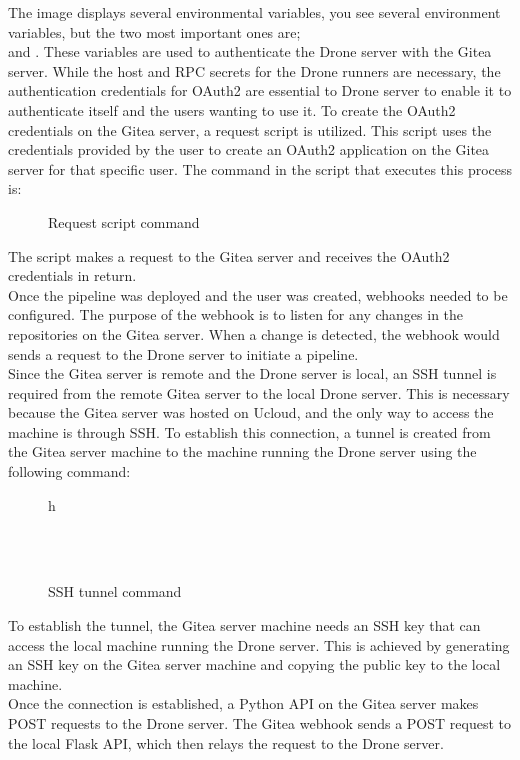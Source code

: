 The image displays several environmental variables,
you see several environment variables, 
but the two most important ones are; \\  and . 
These variables are used to authenticate the Drone server with the Gitea server. 
While the host and RPC secrets for the Drone runners are necessary, 
the authentication credentials for OAuth2 are essential to Drone server to enable it to authenticate itself and the users 
wanting to use it.
To create the OAuth2 credentials 
on the Gitea server, a request script is utilized. This script uses the credentials provided by the user to create an OAuth2 application on the 
Gitea server for that specific user. The command in the script that executes this process is:
\begin{figure}
    \begin{center}
    \end{center}
    \caption{Request script command}
    \label{fig:request-script-command}
\end{figure}
The script makes a  request to the Gitea server and receives the OAuth2 credentials in return.\\
Once the pipeline was deployed and the user was created, webhooks needed to be configured. 
The purpose of the webhook is to listen for any changes in the repositories on the Gitea server. 
When a change is detected, the webhook would sends a request to the Drone server to initiate a pipeline.\\
Since the Gitea server is remote and the Drone server is local, 
an SSH tunnel is required from the remote Gitea server to the local Drone server. 
This is necessary because the Gitea server was hosted on \ac{Ucloud}, and the only way to access the machine is through SSH. 
To establish this connection, a tunnel is created from the Gitea server machine to the machine running the Drone server using the following command:\\
\begin{figure}{h}
    \begin{center}
         \\
        \\
    \end{center}
    \caption{SSH tunnel command}
    \label{fig:ssh-tunnel}
\end{figure}
To establish the tunnel, the Gitea server machine needs an SSH key that can access the local machine running the Drone server. 
This is achieved by generating an SSH key on the Gitea server machine and copying the public key to the local machine.\\
Once the connection is established, a Python API on the Gitea server makes POST requests to the Drone server. 
The Gitea webhook sends a POST request to the local Flask API, which then relays the request to the Drone server.\\